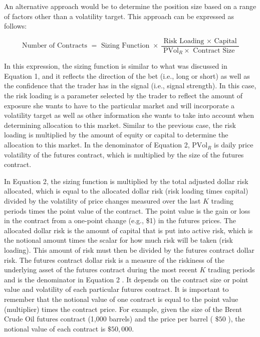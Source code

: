 \documentclass[11pt]{article}
\begin{document}
An alternative approach would be to determine the position size based on a range of factors other than a volatility target. This approach can be expressed as follows:


\begin{equation*}
\text { Number of Contracts }=\text { Sizing Function } \times \frac{\text { Risk Loading } \times \text { Capital }}{\mathrm{PVol}_{R} \times \text { Contract Size }} \tag{2}
\end{equation*}


In this expression, the sizing function is similar to what was discussed in Equation 1, and it reflects the direction of the bet (i.e., long or short) as well as the confidence that the trader has in the signal (i.e., signal strength). In this case, the risk loading is a parameter selected by the trader to reflect the amount of exposure she wants to have to the particular market and will incorporate a volatility target as well as other information she wants to take into account when determining allocation to this market. Similar to the previous case, the risk loading is multiplied by the amount of equity or capital to determine the allocation to this market. In the denominator of Equation 2, $\mathrm{PVol}_{R}$ is daily price volatility of the futures contract, which is multiplied by the size of the futures contract.

In Equation 2, the sizing function is multiplied by the total adjusted dollar risk allocated, which is equal to the allocated dollar risk (risk loading times capital) divided by the volatility of price changes measured over the last $K$ trading periods times the point value of the contract. The point value is the gain or loss in the contract from a one-point change (e.g., \$1) in the futures prices. The allocated dollar risk is the amount of capital that is put into active risk, which is the notional amount times the scalar for how much risk will be taken (risk loading). This amount of risk must then be divided by the futures contract dollar risk. The futures contract dollar risk is a measure of the riskiness of the underlying asset of the futures contract during the most recent $K$ trading periods and is the denominator in Equation 2 . It depends on the contract size or point value and volatility of each particular futures contract. It is important to remember that the notional value of one contract is equal to the point value (multiplier) times the contract price. For example, given the size of the Brent Crude Oil futures contract (1,000 barrels) and the price per barrel ( $\$ 50$ ), the notional value of each contract is $\$ 50,000$.
\end{document}
